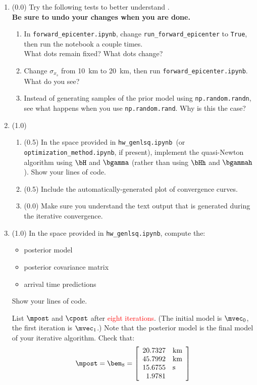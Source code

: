 \documentclass[11pt,titlepage,fleqn]{article}
\newcommand{\tfile}{{\tt hw\_genlsq.ipynb}}
\newcommand{\tfileFE}{{\tt forward\_epicenter.ipynb}}
\newcommand{\tfileOM}{{\tt optimization\_method.ipynb}}
\begin{document}
\begin{enumerate}

\item (0.0) Try the following tests to better understand . \\
{\bf Be sure to undo your changes when you are done.}
%
\begin{enumerate}
\item In \tfileFE, change \verb+run_forward_epicenter+ to \verb+True+, then run the notebook a couple times. \\
What dots remain fixed? What dots change?

\item Change $\sigma_{x_s}$ from 10~km to 20~km, then run \tfileFE. What do you see?

\item Instead of generating samples of the prior model using \verb+np.random.randn+, see what happens when you use \verb+np.random.rand+. Why is this the case?
\end{enumerate}

\item (1.0)
%
\begin{enumerate}
\item (0.5) In the space provided in \tfile\ (or \tfileOM, if present), implement the quasi-Newton algorithm using $\bH$ and $\bgamma$ (rather than using $\bHh$ and $\bgammah$).
Show your lines of code.

\item (0.5) Include the automatically-generated plot of convergence curves.

\item (0.0) Make sure you understand the text output that is generated during the iterative convergence.
\end{enumerate}


\item (1.0) In the space provided in \tfile, compute the:
%
\begin{itemize}
\item posterior model
\item posterior covariance matrix
\item arrival time predictions
\end{itemize}

Show your lines of code.

List $\mpost$ and $\cpost$ after \textcolor{red}{eight iterations}. (The initial model is $\mvec_0$, the first iteration is $\mvec_1$.) Note that the posterior model is the final model of your iterative algorithm. Check that:
%
\begin{eqnarray}
\mpost = \bem_{8} =
\left[
\begin{array}{rl}
20.7327 & {\rm km} \\
45.7992 & {\rm km} \\
15.6755 & {\rm s} \\
1.9781  &  \\
\end{array}
\right]
\end{eqnarray}


\end{enumerate}
\end{document}
